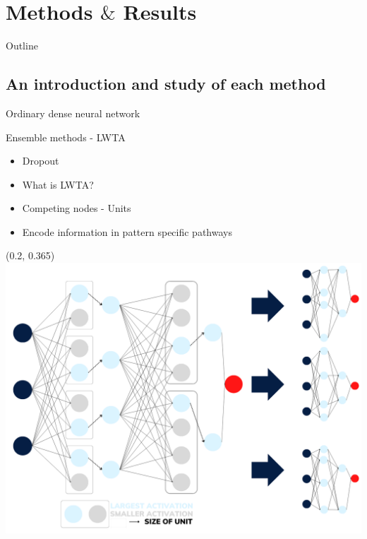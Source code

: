 \documentclass[UKenglish]{beamer}
\begin{document}
\section{Methods $\&$ Results}
\begin{frame}{Outline}
    \tableofcontents[currentsection]
\end{frame}

\subsection*{An introduction and study of each method}


\begin{frame}{Ordinary dense neural network}
    
\end{frame}


\begin{frame}{Ensemble methods - LWTA}
    \begin{itemize}
        \item Dropout
        \item What is LWTA?
        \item Competing nodes - Units
        \item Encode information in pattern specific pathways
    \end{itemize}    
    \begin{textblock}{0.58}(0.2, 0.365)
        \includegraphics[width = \textwidth]{figures/Max_out}
    \end{textblock}
\end{frame}
\end{document}
